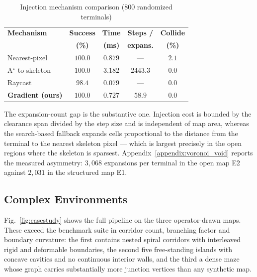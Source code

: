 \documentclass[conference]{IEEEtran}
\begin{document}
\begin{table}[htbp]
\caption{Injection mechanism comparison (800 randomized terminals)}
\label{tab:injection}
\begin{center}
\begin{tabular}{@{}lcccc@{}}
\toprule
\textbf{Mechanism} & \textbf{Success} & \textbf{Time} & \textbf{Steps /} & \textbf{Collide} \\
& \textbf{(\%)} & \textbf{(ms)} & \textbf{expans.} & \textbf{(\%)} \\ \midrule
Nearest-pixel & $100.0$ & $0.879$ & --- & $2.1$ \\
A$^\star$ to skeleton & $100.0$ & $3.182$ & $2443.3$ & $0.0$ \\
Raycast~\cite{qi2025egvg} & $98.4$ & $\mathbf{0.079}$ & --- & $0.0$ \\
\textbf{Gradient (ours)} & $\mathbf{100.0}$ & $0.727$ & $\mathbf{58.9}$ & $\mathbf{0.0}$ \\ \bottomrule
\end{tabular}
\end{center}
\end{table}

The expansion-count gap is the substantive one. Injection cost is bounded by the clearance span divided by the step size and is independent of map area, whereas the search-based fallback expands cells proportional to the distance from the terminal to the nearest skeleton pixel --- which is largest precisely in the open regions where the skeleton is sparsest. Appendix~\ref{appendix:voronoi_void} reports the measured asymmetry: $3{,}068$ expansions per terminal in the open map E2 against $2{,}031$ in the structured map E1.

\subsection{Complex Environments}
\label{sec:casestudy}

Fig.~\ref{fig:casestudy} shows the full pipeline on the three operator-drawn maps. These exceed the benchmark suite in corridor count, branching factor and boundary curvature: the first contains nested spiral corridors with interleaved rigid and deformable boundaries, the second five free-standing islands with concave cavities and no continuous interior walls, and the third a dense maze whose graph carries substantially more junction vertices than any synthetic map.
\end{document}
